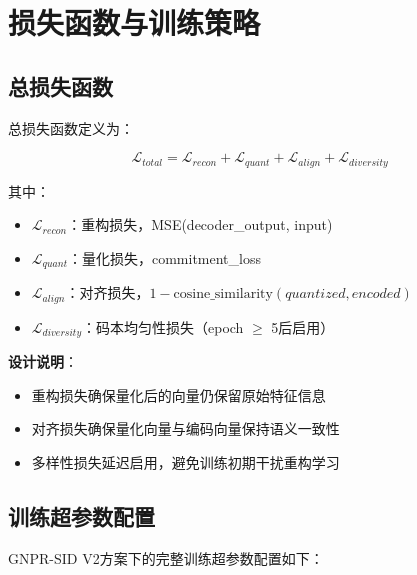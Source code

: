 \section{损失函数与训练策略}
\label{sec:training_strategy}

\subsection{总损失函数}
\label{sec:rqvae_loss}

总损失函数定义为：

\begin{equation}
\mathcal{L}_{total} = \mathcal{L}_{recon} + \mathcal{L}_{quant} + \mathcal{L}_{align} + \mathcal{L}_{diversity}
\label{eq:rqvae_loss}
\end{equation}

其中：
\begin{itemize}
    \item $\mathcal{L}_{recon}$：重构损失，MSE(decoder\_output, input)
    \item $\mathcal{L}_{quant}$：量化损失，commitment\_loss
    \item $\mathcal{L}_{align}$：对齐损失，$1 - \text{cosine\_similarity}(quantized, encoded)$
    \item $\mathcal{L}_{diversity}$：码本均匀性损失（epoch $\geq$ 5后启用）
\end{itemize}

\textbf{设计说明}：
\begin{itemize}
    \item 重构损失确保量化后的向量仍保留原始特征信息
    \item 对齐损失确保量化向量与编码向量保持语义一致性
    \item 多样性损失延迟启用，避免训练初期干扰重构学习
\end{itemize}

\subsection{训练超参数配置}
\label{sec:training_hyperparams}

GNPR-SID V2方案下的完整训练超参数配置如下：

